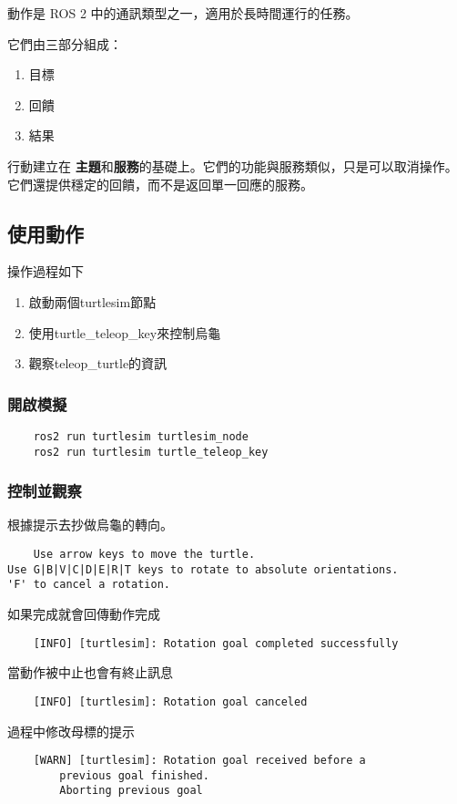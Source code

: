 動作是 ROS 2 中的通訊類型之一，適用於長時間運行的任務。

它們由三部分組成：
\begin{enumerate}
    \item 目標
    \item 回饋
    \item 結果
\end{enumerate}

行動建立在 \textbf{主題}和\textbf{服務}的基礎上。它們的功能與服務類似，只是可以取消操作。它們還提供穩定的回饋，而不是返回單一回應的服務。

\subsection{使用動作}
操作過程如下
\begin{enumerate}
    \item 啟動兩個turtlesim節點
    \item 使用turtle\_teleop\_key來控制烏龜
    \item 觀察teleop\_turtle的資訊
\end{enumerate}


\subsubsection{開啟模擬}
\begin{verbatim}
    ros2 run turtlesim turtlesim_node
    ros2 run turtlesim turtle_teleop_key
\end{verbatim}
\subsubsection{控制並觀察}
根據提示去抄做烏龜的轉向。
\begin{verbatim}
    Use arrow keys to move the turtle.
Use G|B|V|C|D|E|R|T keys to rotate to absolute orientations. 
'F' to cancel a rotation.
\end{verbatim}
如果完成就會回傳動作完成
\begin{verbatim}
    [INFO] [turtlesim]: Rotation goal completed successfully
\end{verbatim}
當動作被中止也會有終止訊息
\begin{verbatim}
    [INFO] [turtlesim]: Rotation goal canceled
\end{verbatim}
過程中修改母標的提示
\begin{verbatim}
    [WARN] [turtlesim]: Rotation goal received before a 
        previous goal finished. 
        Aborting previous goal
\end{verbatim}

